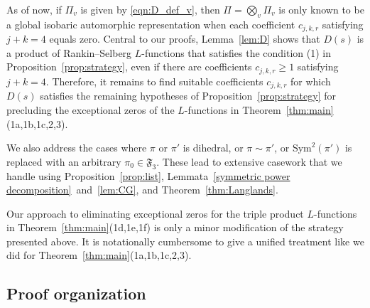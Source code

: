 \documentclass[11pt]{amsart}
\theoremstyle{remark}
\newcommand{\Sym}{\mathrm{Sym}}
\numberwithin{equation}{section}
\begin{document}
As of now, if $\Pi_v$ is given by \eqref{eqn:D_def_v}, then $\Pi=\bigotimes_v \Pi_v$ is only known to be a global isobaric automorphic representation when each coefficient $c_{j,k,r}$ satisfying $j+k=4$ equals zero.  Central to our proofs, Lemma~\ref{lem:D} shows that $D(s)$ is a product of Rankin--Selberg $L$-functions that satisfies the condition (1) in Proposition~\ref{prop:strategy}, even if there are coefficients $c_{j,k,r}\geq 1$ satisfying $j+k=4$.  Therefore, it remains to find suitable coefficients $c_{j,k,r}$ for which $D(s)$ satisfies the remaining hypotheses of Proposition~\ref{prop:strategy} for precluding the exceptional zeros of the $L$-functions in Theorem~\ref{thm:main}(1a,1b,1c,2,3).

We also address the cases where $\pi$ or $\pi'$ is dihedral, or $\pi\sim\pi'$, or $\Sym^2(\pi')$ is replaced with an arbitrary $\pi_0\in\mathfrak{F}_3$.  These lead to extensive casework that we handle using Proposition~\ref{prop:list}, Lemmata~\ref{symmetric power decomposition}~and~\ref{lem:CG}, and Theorem~\ref{thm:Langlands}.

Our approach to eliminating exceptional zeros for the triple product $L$-functions in Theorem~\ref{thm:main}(1d,1e,1f) is only a minor modification of the strategy presented above.  It is notationally cumbersome to give a unified treatment like we did for Theorem~\ref{thm:main}(1a,1b,1c,2,3).

\subsection{Proof organization}
\end{document}

